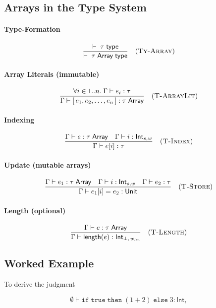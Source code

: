 \subsection*{Arrays in the Type System}

\paragraph{Type‐Formation}
\[
  \frac{\vdash\;\tau\;\mathsf{type}}
       {\vdash\;\tau\;\mathsf{Array}\;\mathsf{type}}
  \quad(\textsc{Ty-Array})
\]

\paragraph{Array Literals (immutable)}  
\[
  \frac{\forall i\in 1..n.\;\Gamma\vdash e_i:\tau}
       {\Gamma\vdash [\,e_1,e_2,\dots,e_n\,] : \tau\;\mathsf{Array}}
  \quad(\textsc{T-ArrayLit})
\]

\paragraph{Indexing}
\[
  \frac{\Gamma\vdash e : \tau\;\mathsf{Array}
        \quad
        \Gamma\vdash i : \mathsf{Int}_{s,w}}
       {\Gamma\vdash e[i] : \tau}
  \quad(\textsc{T-Index})
\]

\paragraph{Update (mutable arrays)}  
\[
  \frac{\Gamma\vdash e_1 : \tau\;\mathsf{Array}
        \quad
        \Gamma\vdash i : \mathsf{Int}_{s,w}
        \quad
        \Gamma\vdash e_2 : \tau}
       {\Gamma\vdash e_1[i] = e_2 : \mathsf{Unit}}
  \quad(\textsc{T-Store})
\]

\paragraph{Length (optional)}  
\[
  \frac{\Gamma\vdash e : \tau\;\mathsf{Array}}
       {\Gamma\vdash \mathsf{length}(e) : \mathsf{Int}_{\bot,\,w_{\mathit{len}}}}
  \quad(\textsc{T-Length})
\]


\subsection{Worked Example}
To derive the judgment

$$
  \emptyset \vdash \mathtt{if}\;\mathtt{true}\;\mathtt{then}\;(1+2)\;\mathtt{else}\;3 : \mathsf{Int},
$$

